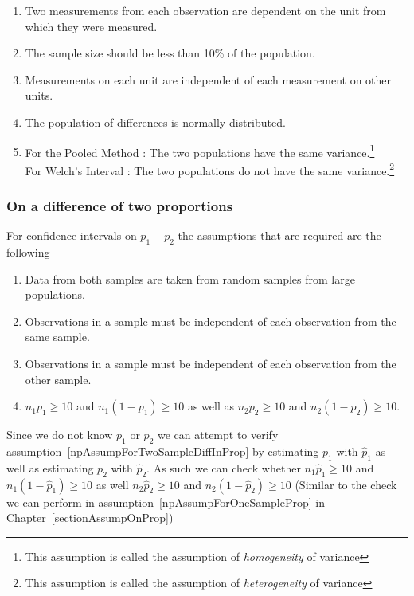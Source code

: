 \begin{enumerate}
\item	Two measurements from each observation are dependent on the unit from which they were measured.
\item	The sample size should be less than 10\% of the population.
\item	Measurements on each unit are independent of each measurement on other units.
\item	The population of differences is normally distributed.
\item	For the Pooled Method : The two populations have the same variance.\footnote{This assumption is called the assumption of \emph{homogeneity} of variance}\\
	For Welch's Interval	: The two populations do not have the same variance.\footnote{This assumption is called the assumption of \emph{heterogeneity} of variance}
\end{enumerate}






\subsubsection{On a difference of two proportions}

For confidence intervals on $p_{1} - p_{2}$ the assumptions that are required are the following

\begin{enumerate}
\item	Data from both samples are taken from random samples from large populations.
\item	Observations in a sample must be independent of each observation from the same sample.
\item	Observations in a sample must be independent of each observation from the other sample.
\item	$n_{1}p_{1} \geq 10$ and $n_{1}(1-p_{1}) \geq 10$ 
	as well as $n_{2}p_{2} \geq 10$ and $n_{2}(1-p_{2}) \geq 10$.
	\label{npAssumpForTwoSampleDiffInProp}
\end{enumerate}

Since we do not know $p_{1}$ or $p_{2}$ we can attempt to verify assumption~\ref{npAssumpForTwoSampleDiffInProp} by estimating 
$p_{1}$ with $\hat{p}_{1}$ as well as estimating
$p_{2}$ with $\hat{p}_{2}$.
As such we can check whether
$n_{1}\hat{p}_{1} \geq 10$ and $n_{1}(1-\hat{p}_{1}) \geq 10$ 
as well
$n_{2}\hat{p}_{2} \geq 10$ and $n_{2}(1-\hat{p}_{2}) \geq 10$ 
(Similar to the check we can perform in assumption~\ref{npAssumpForOneSampleProp}
in Chapter~\ref{sectionAssumpOnProp})





